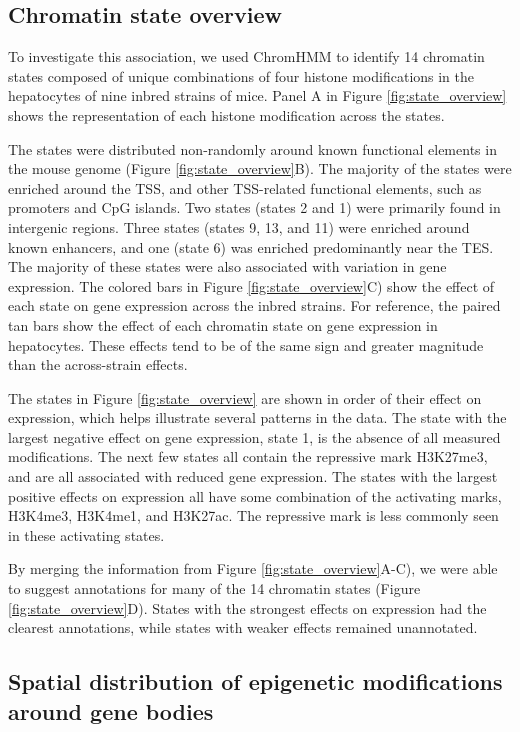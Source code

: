 \documentclass[10pt,letterpaper]{article}
\begin{document}
\hypertarget{chromatin-state-overview}{%
\subsection{Chromatin state overview}\label{chromatin-state-overview}}

To investigate this association, we used ChromHMM to identify 14
chromatin states composed of unique combinations of four histone
modifications in the hepatocytes of nine inbred strains of mice. Panel A
in Figure \ref{fig:state_overview} shows the representation of each
histone modification across the states.

The states were distributed non-randomly around known functional
elements in the mouse genome (Figure \ref{fig:state_overview}B). The
majority of the states were enriched around the TSS, and other
TSS-related functional elements, such as promoters and CpG islands. Two
states (states 2 and 1) were primarily found in intergenic regions.
Three states (states 9, 13, and 11) were enriched around known
enhancers, and one (state 6) was enriched predominantly near the TES.
The majority of these states were also associated with variation in gene
expression. The colored bars in Figure \ref{fig:state_overview}C) show
the effect of each state on gene expression across the inbred strains.
For reference, the paired tan bars show the effect of each chromatin
state on gene expression in hepatocytes. These effects tend to be of the
same sign and greater magnitude than the across-strain effects.

The states in Figure \ref{fig:state_overview} are shown in order of
their effect on expression, which helps illustrate several patterns in
the data. The state with the largest negative effect on gene expression,
state 1, is the absence of all measured modifications. The next few
states all contain the repressive mark H3K27me3, and are all associated
with reduced gene expression. The states with the largest positive
effects on expression all have some combination of the activating marks,
H3K4me3, H3K4me1, and H3K27ac. The repressive mark is less commonly seen
in these activating states.

By merging the information from Figure \ref{fig:state_overview}A-C), we
were able to suggest annotations for many of the 14 chromatin states
(Figure \ref{fig:state_overview}D). States with the strongest effects on
expression had the clearest annotations, while states with weaker
effects remained unannotated.

\hypertarget{spatial-distribution-of-epigenetic-modifications-around-gene-bodies}{%
\subsection{Spatial distribution of epigenetic modifications around gene
bodies}\label{spatial-distribution-of-epigenetic-modifications-around-gene-bodies}}
\end{document}
